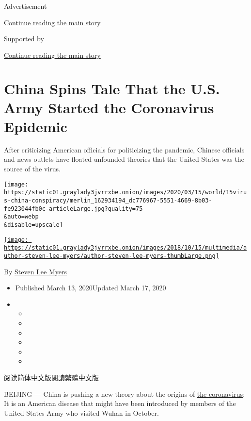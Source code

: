 Advertisement

\protect\hyperlink{after-top}{Continue reading the main story}

Supported by

\protect\hyperlink{after-sponsor}{Continue reading the main story}

\hypertarget{china-spins-tale-that-the-us-army-started-the-coronavirus-epidemic}{%
\section{China Spins Tale That the U.S. Army Started the Coronavirus
Epidemic}\label{china-spins-tale-that-the-us-army-started-the-coronavirus-epidemic}}

After criticizing American officials for politicizing the pandemic,
Chinese officials and news outlets have floated unfounded theories that
the United States was the source of the virus.

\texttt{[image: https://static01.graylady3jvrrxbe.onion/images/2020/03/15/world/15virus-china-conspiracy/merlin\_162934194\_dc776967-5551-4669-8b03-fe923044fb0c-articleLarge.jpg?quality=75\\\&auto=webp\\\&disable=upscale]}

\href{https://www.nytimes3xbfgragh.onion/by/steven-lee-myers}{\texttt{[image: https://static01.graylady3jvrrxbe.onion/images/2018/10/15/multimedia/author-steven-lee-myers/author-steven-lee-myers-thumbLarge.png]}}

By \href{https://www.nytimes3xbfgragh.onion/by/steven-lee-myers}{Steven
Lee Myers}

\begin{itemize}
\item
  Published March 13, 2020Updated March 17, 2020
\item
  \begin{itemize}
  \item
  \item
  \item
  \item
  \item
  \item
  \end{itemize}
\end{itemize}

\href{https://cn.nytimes3xbfgragh.onion/china/20200315/coronavirus-china-conspiracy-theory/}{阅读简体中文版}\href{https://cn.nytimes3xbfgragh.onion/china/20200315/coronavirus-china-conspiracy-theory/zh-hant/}{閱讀繁體中文版}

BEIJING --- China is pushing a new theory about the origins of
\href{https://www.nytimes3xbfgragh.onion/interactive/2020/03/13/world/asia/coronavirus-death-life.html?action=click\&module=Top\%20Stories\&pgtype=Homepage}{the
coronavirus}: It is an American disease that might have been introduced
by members of the United States Army who visited Wuhan in October.

